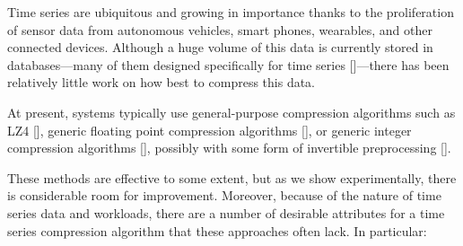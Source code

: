 




Time series are ubiquitous and growing in importance thanks to the proliferation of sensor data from autonomous vehicles, smart phones, wearables, and other connected devices. Although a huge volume of this data is currently stored in databases---many of them designed specifically for time series []---there has been relatively little work on how best to compress this data.

At present, systems typically use general-purpose compression algorithms such as LZ4 [], generic floating point compression algorithms [], or generic integer compression algorithms [], possibly with some form of invertible preprocessing [].

These methods are effective to some extent, but as we show experimentally, there is considerable room for improvement. Moreover, because of the nature of time series data and workloads, there are a number of desirable attributes for a time series compression algorithm that these approaches often lack. In particular:




